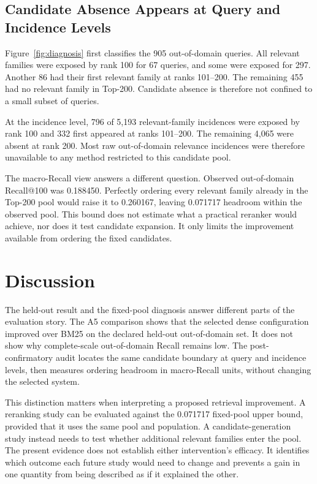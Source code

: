 \documentclass[a4paper,conference]{IEEEtran}
\begin{document}
\subsection{Candidate Absence Appears at Query and Incidence Levels}
Figure~\ref{fig:diagnosis} first classifies the 905 out-of-domain queries. All
relevant families were exposed by rank 100 for 67 queries, and some were
exposed for 297. Another 86 had their first relevant family at ranks 101--200.
The remaining 455 had no relevant family in Top-200. Candidate absence is
therefore not confined to a small subset of queries.

At the incidence level, 796 of 5,193 relevant-family incidences were exposed by
rank 100 and 332 first appeared at ranks 101--200. The remaining 4,065 were
absent at rank 200. Most raw out-of-domain relevance incidences were therefore
unavailable to any method restricted to this candidate pool.

The macro-Recall view answers a different question. Observed out-of-domain
Recall@100 was 0.188450. Perfectly ordering every relevant family already in the
Top-200 pool would raise it to 0.260167, leaving 0.071717 headroom within the
observed pool. This bound does not estimate what a practical reranker would
achieve, nor does it test candidate expansion. It only limits the improvement
available from ordering the fixed candidates.

\section{Discussion}
The held-out result and the fixed-pool diagnosis answer different parts of the
evaluation story. The A5 comparison shows that the selected dense configuration
improved over BM25 on the declared held-out out-of-domain set. It does not show
why complete-scale out-of-domain Recall remains low. The post-confirmatory audit
locates the same candidate boundary at query and incidence levels, then measures
ordering headroom in macro-Recall units, without changing the selected system.

This distinction matters when interpreting a proposed retrieval improvement.
A reranking study can be evaluated against the 0.071717 fixed-pool upper bound,
provided that it uses the same pool and population. A candidate-generation
study instead needs to test whether additional relevant families enter the
pool. The present evidence does not establish either intervention's efficacy.
It identifies which outcome each future study would need to change and prevents
a gain in one quantity from being described as if it explained the other.
\end{document}
